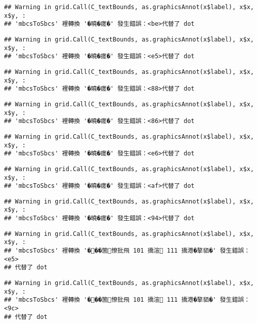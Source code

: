 \documentclass[
]{article}
\begin{document}
\begin{verbatim}
## Warning in grid.Call(C_textBounds, as.graphicsAnnot(x$label), x$x, x$y, :
## 'mbcsToSbcs' 裡轉換 '�曉�瘥�' 發生錯誤：<be>代替了 dot
\end{verbatim}

\begin{verbatim}
## Warning in grid.Call(C_textBounds, as.graphicsAnnot(x$label), x$x, x$y, :
## 'mbcsToSbcs' 裡轉換 '�曉�瘥�' 發生錯誤：<e5>代替了 dot
\end{verbatim}

\begin{verbatim}
## Warning in grid.Call(C_textBounds, as.graphicsAnnot(x$label), x$x, x$y, :
## 'mbcsToSbcs' 裡轉換 '�曉�瘥�' 發生錯誤：<88>代替了 dot
\end{verbatim}

\begin{verbatim}
## Warning in grid.Call(C_textBounds, as.graphicsAnnot(x$label), x$x, x$y, :
## 'mbcsToSbcs' 裡轉換 '�曉�瘥�' 發生錯誤：<86>代替了 dot
\end{verbatim}

\begin{verbatim}
## Warning in grid.Call(C_textBounds, as.graphicsAnnot(x$label), x$x, x$y, :
## 'mbcsToSbcs' 裡轉換 '�曉�瘥�' 發生錯誤：<e6>代替了 dot
\end{verbatim}

\begin{verbatim}
## Warning in grid.Call(C_textBounds, as.graphicsAnnot(x$label), x$x, x$y, :
## 'mbcsToSbcs' 裡轉換 '�曉�瘥�' 發生錯誤：<af>代替了 dot
\end{verbatim}

\begin{verbatim}
## Warning in grid.Call(C_textBounds, as.graphicsAnnot(x$label), x$x, x$y, :
## 'mbcsToSbcs' 裡轉換 '�曉�瘥�' 發生錯誤：<94>代替了 dot
\end{verbatim}

\begin{verbatim}
## Warning in grid.Call(C_textBounds, as.graphicsAnnot(x$label), x$x, x$y, :
## 'mbcsToSbcs' 裡轉換 '���箇憭批飛 101 撟渲 111 撟港�摮貊�' 發生錯誤：<e5>
## 代替了 dot
\end{verbatim}

\begin{verbatim}
## Warning in grid.Call(C_textBounds, as.graphicsAnnot(x$label), x$x, x$y, :
## 'mbcsToSbcs' 裡轉換 '���箇憭批飛 101 撟渲 111 撟港�摮貊�' 發生錯誤：<9c>
## 代替了 dot
\end{verbatim}
\end{document}
